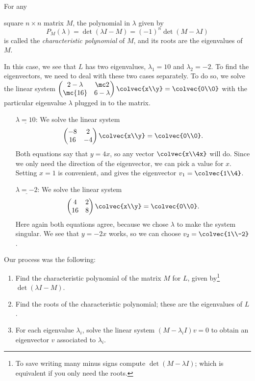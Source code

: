 \begin{example}
\hypertarget{characteristic_polynomial}{For any} square $n\times n$ matrix $M$, the polynomial in $\lambda$ given by $$P_M(\lambda)=\det (\lambda I-M)=(-1)^n \det (M-\lambda I)$$ is called the \emph{characteristic polynomial} of $M$, and its roots are the eigenvalues of $M$.

In this case, we see that $L$ has two eigenvalues, $\lambda_1=10$ and $\lambda_2=-2$.  To find the eigenvectors, we need to deal with these two cases separately.
To do so, we solve the linear system $\begin{pmatrix}
2-\lambda & \mc2 \\
\mc{16} & 6-\lambda
\end{pmatrix}\colvec{x\\y}= \colvec{0\\0}$ with the particular eigenvalue $\lambda$ plugged in to the matrix.

\begin{itemize}
\item[$\underline{\lambda=10}$:]  We solve the linear system
\[
\begin{pmatrix}
-8 & 2 \\
16 & -4
\end{pmatrix}\colvec{x\\y}= \colvec{0\\0}.
\] 
Both equations say that $y=4x$, so any vector $\colvec{x\\4x}$ will do.  Since we only need the direction of the eigenvector, we can pick a value for $x$.  Setting $x=1$ is convenient, and gives the eigenvector $v_1=\colvec{1\\4}$.

\item[$\underline{\lambda=-2}$:]  We solve the linear system
\[
\begin{pmatrix}
4 & 2 \\
16 & 8
\end{pmatrix}\colvec{x\\y}= \colvec{0\\0}.
\] 
Here again both equations agree, because we chose $\lambda$ to make the system singular.  We see that $y=-2x$ works, so we can choose $v_2=\colvec{1\\-2}$.
\end{itemize}

Our process was the following:
\begin{enumerate}
\item Find the characteristic polynomial of the matrix $M$ for $L$, given by\footnote{To save writing many minus signs compute $\det(M-\lambda I)$; which is equivalent if you only need the roots.} $\det (\lambda I-M)$.
\item Find the roots of the characteristic polynomial; these are the eigenvalues of $L$.
\item For each eigenvalue $\lambda_i$, solve the linear system $(M-\lambda_i I)v=0$ to obtain an eigenvector $v$ associated to $\lambda_i$.
\end{enumerate}
\end{example}

